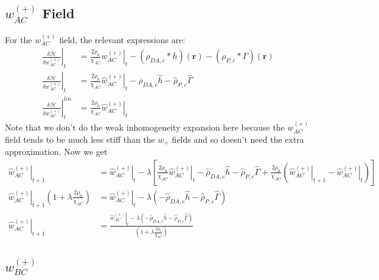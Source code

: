 \documentclass{article}
\begin{document}
\subsection{$w_{AC}^{(+)}$ Field}

For the $w_{AC}^{(+)}$ field, the relevant expressions are:
\begin{align*}
  \left. \frac{\delta \mathcal{H}}{\delta w_{AC}^{(+)}} \right|_t &=
    \frac{2 \rho_0}{\chi_{AC}} \left. w_{AC}^{(+)} \right|_t
    - (\rho_{DA,c} \ast h)(\mathbf{r})
    - (\rho_{P,c} \ast \Gamma)(\mathbf{r}) \\
  \left. \hat{\frac{\delta \mathcal{H}}{\delta w_{AC}^{(+)}}} \right|_t &=
    \frac{2 \rho_0}{\chi_{AC}} \left. \hat{w}_{AC}^{(+)} \right|_t
    - \hat{\rho}_{DA,c} \hat{h}
    - \hat{\rho}_{P,c}  \hat{\Gamma} \\
  \left.
    \hat{\frac{\delta \mathcal{H}}{\delta w_{AC}^{(+)}}}
  \right| ^{lin}_t &=
    \frac{2\rho_0}{\chi_{AC}} \left. \hat{w}_{AC}^{(+)} \right|_t
\end{align*}
Note that we don't do the weak inhomogeneity expansion here because the
  $w_{AC}^{(+)}$ field tends to be much less stiff than the $w_+$ fields and so
  doesn't need the extra approximation.
Now we get
\begin{align*}
  \left. \hat{w}_{AC}^{(+)} \right|_{t+1} &=
    \left. \hat{w}_{AC}^{(+)} \right|_t - \lambda \left[
      \frac{2\rho_0}{\chi_{AC}} \left. \hat{w}_{AC}^{(+)} \right|_t
      - \hat{\rho}_{DA,c} \hat{h}
      - \hat{\rho}_{P,c}  \hat{\Gamma}
      + \frac{2\rho_0}{\chi_{AC}}
        ( \left. \hat{w}_{AC}^{(+)}\right|_{t+1}
          - \left. \hat{w}_{AC}^{(+)} \right|_t
        )
    \right] \\
  \left. \hat{w}_{AC}^{(+)} \right|_{t+1} ( 1 + \lambda \frac{2
    \rho_0}{\chi_{AC}} ) &=
    \left. \hat{w}_{AC}^{(+)} \right|_t - \lambda \left(
      - \hat{\rho}_{DA,c} \hat{h}
      - \hat{\rho}_{P,c}  \hat{\Gamma}
    \right) \\
  \left. \hat{w}_{AC}^{(+)} \right|_{t+1} &=
    \frac{
      \left. \hat{w}_{AC}^{(+)} \right|_t - \lambda \left(
        - \hat{\rho}_{DA,c} \hat{h}
        - \hat{\rho}_{P,c}  \hat{\Gamma}
      \right)
    }
    {
      \left( 1 + \lambda \frac{2 \rho_0}{\chi_{AC}} \right)
    }
\end{align*}

\subsection{$w_{BC}^{(+)}$}
\end{document}
